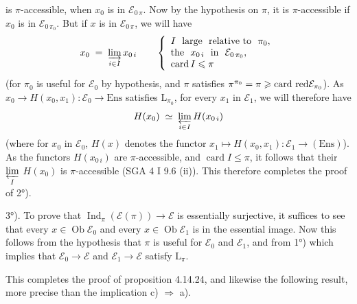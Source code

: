 \documentclass[11pt]{article}
\newcommand{\printedpage}[1]{\marginpar{\footnotesize p.~#1}}
\newcommand{\msp}[1]{\marginpar{\footnotesize [#1]}}
\newcommand{\cE}{\mathcal{E}}
\newcommand{\Ob}{\operatorname{Ob}}
\newcommand{\Ind}{\operatorname{Ind}}
\newcommand{\Ens}{\mathrm{Ens}}
\newcommand{\card}{\operatorname{card}}
\newcommand{\cardred}{\operatorname{card}\,\text{\upshape red}}
\begin{document}
\setcounter{footnote}{174}

\printedpage{159}

\msp{page 419}
is $\pi$-accessible, when $x_0$ is in $\cE_{0\,\pi}$. Now by the hypothesis on $\pi$, it is $\pi$-accessible if $x_0$ is in $\cE_{0\,\pi_0}$. But if $x$ is in $\cE_{0\,\pi}$, we will have %
\[
x_0 \;=\; \varinjlim_{i\in I} x_{0\,i} \qquad
\left\{
\begin{array}{l}
I\ \ \text{large}\ \ \text{relative to}\ \ \pi_0,\\
\text{the}\ \ x_{0\,i}\ \ \text{in}\ \ \cE_{0\,\pi_0},\\
\card I \leqslant \pi
\end{array}
\right.
\]
(for $\pi_0$ is useful for $\cE_0$ by hypothesis, and $\pi$ satisfies $\pi^{\pi_0} = \pi \geqslant \cardred \cE_{\pi_0}$). As $x_0 \longrightarrow H(x_0,x_1) : \cE_0 \longrightarrow \Ens$ satisfies $\mathrm{L}_{\pi_0}$, for every $x_1$ in $\cE_1$, we will therefore have %
\[
H(x_0) \;\simeq\; \varprojlim_{i\in I} H(x_{0\,i})
\]
(where for $x_0$ in $\cE_0$, $H(x)$ denotes the functor $x_1 \longmapsto H(x_0,x_1) : \cE_1 \longrightarrow (\Ens)$). As %
the functors $H(x_{0\,i})$ are $\pi$-accessible, and $\card I \leqslant \pi$, it follows that their $\varprojlim\limits_{I}$ $H(x_0)$ is $\pi$-accessible (SGA 4 I 9.6 (ii)). This therefore completes the proof of 2°).

3°). To prove that $\Ind_\pi(\cE(\pi)) \longrightarrow \cE$ is essentially surjective, it suffices to see that every $x \in \Ob\cE_0$ and every $x \in \Ob\cE_1$
\msp{page 420}
is in the essential image. Now this follows from the hypothesis that $\pi$ is useful for $\cE_0$ and $\cE_1$, and from 1°) which implies that $\cE_0 \longrightarrow \cE$ and $\cE_1 \longrightarrow \cE$ satisfy $\mathrm{L}_\pi$.

This completes the proof of proposition 4.14.24, and likewise the following result, more precise than the implication c) $\Longrightarrow$ a).
\end{document}
